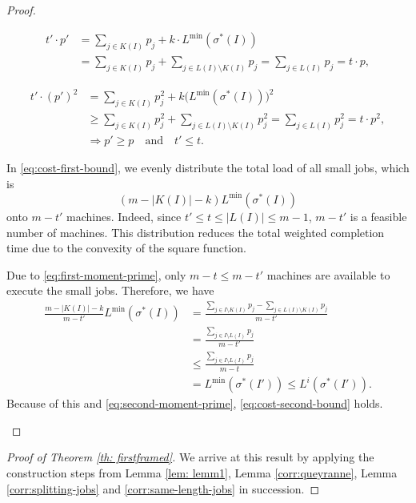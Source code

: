 \documentclass[%
english, titlepage=false %
]{./tum-templates/book/tumbook}
\begin{document}
\begin{proof}
\begin{enumerate}[label=(\arabic*)]
\begin{align}\label{eq:first-moment-prime}
    t'\cdot p'
    &=
    \sum_{j\in K(I)}p_j
    +k\cdot L^{\min}(\sigma^{*}(I))\\
    &=
    \sum_{j\in K(I)}p_j +\sum_{j\in L(I)\setminus K(I)}p_j
    =
    \sum_{j\in L(I)}p_j
    =
    t\cdot p,
\end{align}

\begin{equation}\label{eq:second-moment-prime}
\begin{aligned}
    t'\cdot(p')^2
    &=
    \sum_{j\in K(I)}p_j^2
    +k\bigl(L^{\min}(\sigma^{*}(I))\bigr)^2
    \\
    &\geq
    \sum_{j\in K(I)}p_j^2
    +\sum_{j\in L(I)\setminus K(I)}p_j^2
    =
    \sum_{j\in L(I)}p_j^2
    =
    t\cdot p^2,
    \\
    &\Rightarrow
    p'\geq p
    \quad\text{and}\quad
    t'\leq t.
\end{aligned}
\end{equation}

In \eqref{eq:cost-first-bound}, we evenly distribute the total load of all small jobs, which is
\[
        (m-|K(I)|-k)L^{\min}(\sigma^{*}(I))
\]
onto $m-t'$ machines. Indeed, since 
$t' \le t \le |L(I)| \le m-1$, $m-t'$ is a feasible number of machines. 
This distribution reduces the total
weighted completion time due to the convexity of the square function.

Due to \eqref{eq:first-moment-prime}, only
$m-t\leq m-t'$ machines are available to execute the small jobs. Therefore, we have
\[
\begin{aligned}
\frac{m-|K(I)|-k}{m-t'}L^{\min}(\sigma^*(I))
&=
\frac{\sum_{j\in I\setminus K(I)}p_j
      -\sum_{j\in L(I)\setminus K(I)}p_j}{m-t'} \\
&=
\frac{\sum_{j\in I\setminus L(I)}p_j}{m-t'} \\
&\leq
\frac{\sum_{j\in I\setminus L(I)}p_j}{m-t} \\
&=
L^{\min}(\sigma^*(I'))
\leq
L^i(\sigma^*(I')).
\end{aligned}
\]
Because of this and \eqref{eq:second-moment-prime}, \eqref{eq:cost-second-bound} holds. 
\end{enumerate}
\end{proof}

\begin{proof}[Proof of Theorem \ref{th: firstframed}]
 We arrive at this result by applying the construction steps from Lemma \ref{lem: lemm1}, Lemma \ref{corr:queyranne},
 Lemma \ref{corr:splitting-jobs} and \ref{corr:same-length-jobs} in succession.
\end{proof}
\end{document}
